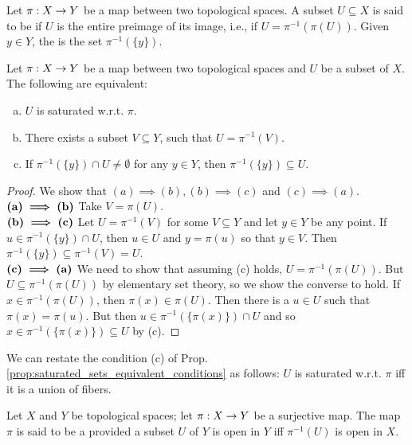 \documentclass[11pt,a4paper]{article}
\begin{document}
\begin{mydef}\label{def:saturated_set}
Let $\pi:X\rightarrow Y$ be a map between two topological spaces. A subset $U\subseteq X$ is said to be  if $U$ is the entire preimage of its image, i.e., if $U = \pi^{-1}(\pi(U))$. Given $y\in Y$, the  is the set $\pi^{-1}(\{y\})$.
\end{mydef}

\begin{prop}\label{prop:saturated_sets_equivalent_conditions}
Let $\pi:X\rightarrow Y$ be a map between two topological spaces and $U$ be a subset of $X$. The following are equivalent:
\begin{enumerate}[(a)]
    \item $U$ is saturated w.r.t. $\pi$.
    \item There exists a subset $V\subseteq Y$, such that $U=\pi^{-1}(V)$.
    \item If $\pi^{-1}(\{y\}) \cap U \neq \emptyset$ for any $y\in Y$, then $\pi^{-1}(\{y\})\subseteq U$.
\end{enumerate}
\end{prop}

\begin{proof}
We show that $(a)\implies (b), (b)\implies(c)$ and $(c)\implies (a)$.\\
$\textbf{(a)}\boldsymbol{\implies}\textbf{(b)}$ Take $V = \pi(U)$.
\\
$\textbf{(b)}\boldsymbol{\implies}\textbf{(c)}$ Let $U = \pi^{-1}(V)$ for some $V\subseteq Y$ and let $y\in Y$ be any point. If $u\in \pi^{-1}(\{y\})\cap U$, then $u\in U$ and $y = \pi(u)$ so that $y\in V$. Then $\pi^{-1}(\{y\})\subseteq \pi^{-1}(V) = U$.
\\
$\textbf{(c)}\boldsymbol{\implies}\textbf{(a)}$ We need to show that assuming (c) holds, $U = \pi^{-1}(\pi(U))$. But $U\subseteq \pi^{-1}(\pi(U))$ by elementary set theory, so we show the converse to hold. If $x\in \pi^{-1}(\pi(U))$, then $\pi(x)\in \pi(U)$. Then there is a $u\in U$ such that $\pi(x) = \pi(u)$. But then $u\in \pi^{-1}(\{\pi(x)\})\cap U$ and so $x\in \pi^{-1}(\{\pi(x)\})\subseteq U$ by (c).
\end{proof}

\begin{remark}
We can restate the condition (c) of Prop. \ref{prop:saturated_sets_equivalent_conditions} as follows:
$U$ is saturated w.r.t. $\pi$ iff it is a union of fibers.
\end{remark}

\begin{mydef}\label{def:quotient_map}
Let $X$ and $Y$ be topological spaces; let $\pi:X\rightarrow Y$ be a surjective map. The map $\pi$ is said to be a  provided a subset $U$ of $Y$ is open in $Y$ iff $\pi^{-1}(U)$ is open in $X$.
\end{mydef}
\end{document}
